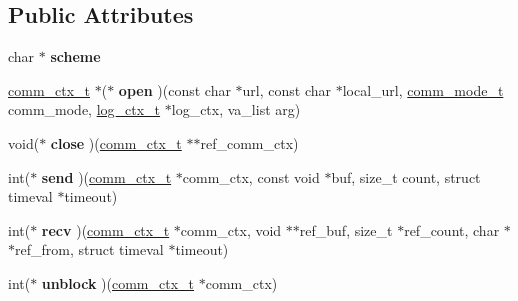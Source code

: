 \subsection*{Public Attributes}
\begin{DoxyCompactItemize}
\item 
char $\ast$ {\bfseries scheme}\hypertarget{structcomm__if__s_a46d130ec366e00c748848f1666bd168e}{}\label{structcomm__if__s_a46d130ec366e00c748848f1666bd168e}

\item 
\hyperlink{comm_8h_aacc0873718a86d8ef4658bad2500d091}{comm\+\_\+ctx\+\_\+t} $\ast$($\ast$ {\bfseries open} )(const char $\ast$url, const char $\ast$local\+\_\+url, \hyperlink{comm_8h_a2604d892f8ab29dfc96bd68e2cc3086f}{comm\+\_\+mode\+\_\+t} comm\+\_\+mode, \hyperlink{structlog__ctx__s}{log\+\_\+ctx\+\_\+t} $\ast$log\+\_\+ctx, va\+\_\+list arg)\hypertarget{structcomm__if__s_ac8bba953c88fa636aeff682e116fa9d1}{}\label{structcomm__if__s_ac8bba953c88fa636aeff682e116fa9d1}

\item 
void($\ast$ {\bfseries close} )(\hyperlink{comm_8h_aacc0873718a86d8ef4658bad2500d091}{comm\+\_\+ctx\+\_\+t} $\ast$$\ast$ref\+\_\+comm\+\_\+ctx)\hypertarget{structcomm__if__s_a077eba49a8a8189a250868920e925956}{}\label{structcomm__if__s_a077eba49a8a8189a250868920e925956}

\item 
int($\ast$ {\bfseries send} )(\hyperlink{comm_8h_aacc0873718a86d8ef4658bad2500d091}{comm\+\_\+ctx\+\_\+t} $\ast$comm\+\_\+ctx, const void $\ast$buf, size\+\_\+t count, struct timeval $\ast$timeout)\hypertarget{structcomm__if__s_aea8ef75cc832cd88f0a8f8fcccc00f48}{}\label{structcomm__if__s_aea8ef75cc832cd88f0a8f8fcccc00f48}

\item 
int($\ast$ {\bfseries recv} )(\hyperlink{comm_8h_aacc0873718a86d8ef4658bad2500d091}{comm\+\_\+ctx\+\_\+t} $\ast$comm\+\_\+ctx, void $\ast$$\ast$ref\+\_\+buf, size\+\_\+t $\ast$ref\+\_\+count, char $\ast$$\ast$ref\+\_\+from, struct timeval $\ast$timeout)\hypertarget{structcomm__if__s_a28e7de5768bc096208c18aaf41c1e2a1}{}\label{structcomm__if__s_a28e7de5768bc096208c18aaf41c1e2a1}

\item 
int($\ast$ {\bfseries unblock} )(\hyperlink{comm_8h_aacc0873718a86d8ef4658bad2500d091}{comm\+\_\+ctx\+\_\+t} $\ast$comm\+\_\+ctx)\hypertarget{structcomm__if__s_ad5d4d1d4399aef10770a07372455ca80}{}\label{structcomm__if__s_ad5d4d1d4399aef10770a07372455ca80}

\end{DoxyCompactItemize}


